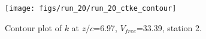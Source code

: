 \begin{figure}[H]
\centering
\texttt{[image: figs/run\_20/run\_20\_ctke\_contour]}
\caption{Contour plot of $k$ at $z/c$=6.97, $V_{free}$=33.39, station 2.}
\label{fig:run_20_ctke_contour}
\end{figure}


